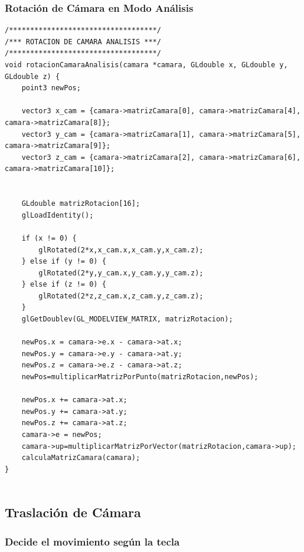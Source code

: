 \documentclass[12pt,a4paper]{article}
\begin{document}
\subsubsection{Rotación de Cámara en Modo Análisis}

\begin{lstlisting}
/***********************************/
/*** ROTACION DE CAMARA ANALISIS ***/
/***********************************/
void rotacionCamaraAnalisis(camara *camara, GLdouble x, GLdouble y, GLdouble z) {
    point3 newPos;

    vector3 x_cam = {camara->matrizCamara[0], camara->matrizCamara[4], camara->matrizCamara[8]};
    vector3 y_cam = {camara->matrizCamara[1], camara->matrizCamara[5], camara->matrizCamara[9]};
    vector3 z_cam = {camara->matrizCamara[2], camara->matrizCamara[6], camara->matrizCamara[10]};


    GLdouble matrizRotacion[16];
    glLoadIdentity();

    if (x != 0) {
        glRotated(2*x,x_cam.x,x_cam.y,x_cam.z);
    } else if (y != 0) {
        glRotated(2*y,y_cam.x,y_cam.y,y_cam.z);
    } else if (z != 0) {
        glRotated(2*z,z_cam.x,z_cam.y,z_cam.z);
    }
    glGetDoublev(GL_MODELVIEW_MATRIX, matrizRotacion);

    newPos.x = camara->e.x - camara->at.x;
    newPos.y = camara->e.y - camara->at.y;
    newPos.z = camara->e.z - camara->at.z;
    newPos=multiplicarMatrizPorPunto(matrizRotacion,newPos);

    newPos.x += camara->at.x;
    newPos.y += camara->at.y;
    newPos.z += camara->at.z;
    camara->e = newPos;
    camara->up=multiplicarMatrizPorVector(matrizRotacion,camara->up);
    calculaMatrizCamara(camara);
}


\end{lstlisting}

\newpage
\subsection{Traslación de Cámara}

\subsubsection{Decide el movimiento según la tecla}
\end{document}
